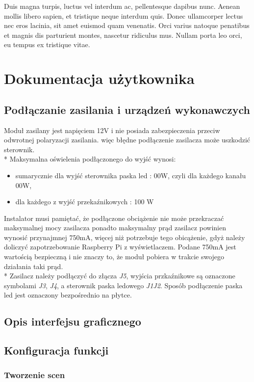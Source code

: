 \documentclass[12pt, eng, twoside, openany, final]{mgr}
\begin{document}
    Duis magna turpis, luctus vel interdum ac, pellentesque dapibus nunc. Aenean mollis libero sapien, et tristique neque interdum quis. Donec ullamcorper lectus nec eros lacinia, sit amet euismod quam venenatis. Orci varius natoque penatibus et magnis dis parturient montes, nascetur ridiculus mus. Nullam porta leo orci, eu tempus ex tristique vitae.
%
\chapter{Dokumentacja użytkownika}
\thispagestyle{fancy}
    \section{Podłączanie zasilania i urządzeń wykonawczych}
    Moduł zasilany jest napięciem 12V i nie posiada zabezpieczenia przeciw odwrotnej polaryzacji zasilania. więc błędne podłączenie zasilacza może uszkodzić sterownik. \\*
    Maksymalna oświelenia podłączonego do wyjść wynosi:
    \begin{itemize}
        \item sumarycznie dla wyjść sterownika paska led : 00W, czyli dla każdego kanału 00W,
        \item dla każdego z wyjść przekaźnikowych : 100 W
    \end{itemize}
    Instalator musi pamiętać, że podłączone obciążenie nie może przekraczać maksymalnej mocy zasilacza ponadto maksymalny prąd zasilacz powinien wynosić przynajmnej 750mA, więcej niż potrzebuje tego obicążenie, gdyż należy doliczyć zapotrzebowanie Raspberry Pi z wyświetlaczem. Podane 750mA jest wartością bezpieczną i nie znaczy to, że moduł pobiera w trakcie swojego działania taki prąd. \\*
    Zasilacz należy podłączyć do złącza \emph{J5}, wyjścia przkaźnikowe są oznaczone symbolami \emph{J3}, \emph{J4}, a sterownik paska ledowego \emph{J1J2}. Sposób podłączenie paska led jest oznaczony bezpośrednio na płytce. 
    
    \section{Opis interfejsu graficznego}
    \section{Konfiguracja funkcji}
        \subsection{Tworzenie scen}
\end{document}
